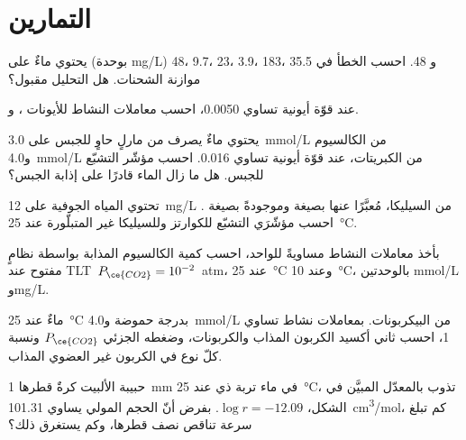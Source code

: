 \section{التمارين}

\begin{exercise}[$\star$]\label{exo:b3:water-rock-interaction:1}
يحتوي ماءٌ على (بوحدة \unit{mg/L})  48،  9.7،  23،  3.9،
 183،  35.5 و 48. احسب الخطأ في موازنة
الشحنات. هل التحليل مقبول؟
\end{exercise}

\begin{exercise}[$\star$]\label{exo:b3:water-rock-interaction:2}
عند قوّة أيونية تساوي 0.0050، احسب معاملات النشاط
للأيونات ،  و.
\end{exercise}

\begin{exercise}[$\star$]\label{exo:b3:water-rock-interaction:3}
يحتوي ماءٌ يصرف من مارلٍ حاوٍ للجبس على \qty{3.0}{mmol/L} من الكالسيوم
و\qty{4.0}{mmol/L} من الكبريتات، عند قوّة أيونية تساوي 0.016. احسب
مؤشّر التشبّع للجبس. هل ما زال الماء قادرًا على إذابة الجبس؟
\end{exercise}

\begin{exercise}[$\star$]\label{exo:b3:water-rock-interaction:4}
تحتوي المياه الجوفية على \qty{12}{mg/L} من السيليكا، مُعبَّرًا عنها بصيغة 
وموجودةً بصيغة . احسب مؤشّرَي التشبّع للكوارتز
وللسيليكا غير المتبلّورة عند \qty{25}{\celsius}.
\end{exercise}

\begin{exercise}[$\star\star$]\label{exo:b3:water-rock-interaction:5}
بأخذ معاملات النشاط مساويةً للواحد، احسب كمية الكالسيوم المذابة بواسطة
نظامٍ مفتوح عند \mbox{\textdir TLT $P_{\ce{CO2}} = 10^{-2}$~atm}، عند \qty{25}{\celsius}
وعند \qty{10}{\celsius}، بالوحدتين \unit{mmol/L} و\unit{mg/L}.
\end{exercise}

\begin{exercise}[$\star\star$]\label{exo:b3:water-rock-interaction:6}
ماءٌ عند \qty{25}{\celsius} بدرجة حموضة  و\qty{4.0}{mmol/L} من
البيكربونات. بمعاملات نشاط تساوي 1، احسب ثاني أكسيد الكربون
المذاب والكربونات، وضغطه الجزئي $P_{\ce{CO2}}$ ونسبة كلّ نوع في
الكربون غير العضوي المذاب.
\end{exercise}

\begin{exercise}[$\star\star$]\label{exo:b3:water-rock-interaction:7}
حبيبة الألبيت كرةٌ قطرها \qty{1}{mm} في ماء تربة ذي  عند
\qty{25}{\celsius}، تذوب بالمعدّل المبيَّن في الشكل، $\log r = -12.09$.
بفرض أنّ الحجم المولي يساوي \qty{101.31}{cm^3/mol}، كم تبلغ سرعة
تناقص نصف قطرها، وكم يستغرق ذلك؟
\end{exercise}

